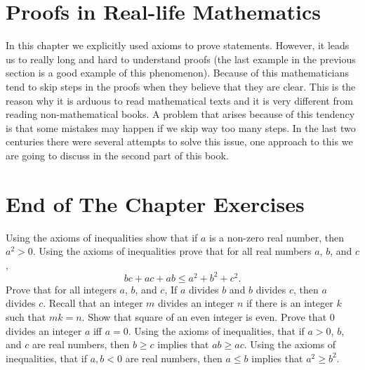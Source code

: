 \section{Proofs in Real-life Mathematics}
In this chapter we explicitly used axioms to prove statements. However, it
leads us to really long and hard to understand proofs (the last example in the
previous section is a good example of this phenomenon). Because of this
mathematicians tend to skip steps in the proofs when they believe that they are
clear. This is the reason why it is arduous to read mathematical texts and it
is very different from reading non-mathematical books. A problem that arises
because of this tendency is that some mistakes may happen if we skip way too many
steps. In the last two centuries there were several attempts to solve this
issue, one approach to this we are going to discuss in the second part of this
book.

\section*{End of The Chapter Exercises}
\begin{exercises}
  \exerciseitem Using the axioms of inequalities show that if $a$ is a non-zero
    real number, then $a^2 > 0$.
  \exerciseitem Using the axioms of inequalities prove that for all real
    numbers $a$, $b$, and $c$, $$bc + ac + ab \le a^2 + b^2 + c^2.$$
  \exerciseitem Prove that for all integers $a$, $b$, and $c$,
    If $a$ divides $b$ and $b$ divides $c$, then $a$ divides $c$.
    Recall that an integer $m$ divides an integer $n$ if there is an integer
    $k$ such that $mk = n$.
  \exerciseitem Show that square of an even integer is even.
  \exerciseitem Prove that $0$ divides an integer $a$ iff $a = 0$.
  \exerciseitem Using the axioms of inequalities, that if $a > 0$, $b$, and $c$
    are real numbers, then $b \ge c$ implies that $ab \ge ac$.
  \exerciseitem Using the axioms of inequalities, that if $a, b < 0$ are real
    numbers, then $a \le b$ implies that $a^2 \ge b^2$.
\end{exercises}
